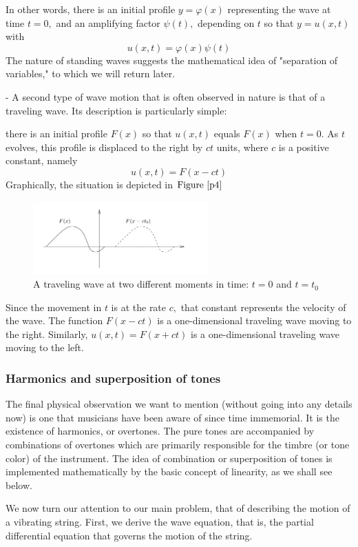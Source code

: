 \documentclass[12pt]{book}
\theoremstyle{definition}\newtheorem{dfn}{Définition}[chapter]
\theoremstyle{plain}\newtheorem{thm}{Théorème}[chapter]
\theoremstyle{plain}\newtheorem{prp}{Proposition}[chapter]
\theoremstyle{plain}\newtheorem{lem}{\bf Lemme}[chapter]
\theoremstyle{plain}\newtheorem{axm}{\bf Axiome}[chapter]
\theoremstyle{plain}\newtheorem{lmm}{\bf Lemme}[chapter]
\theoremstyle{plain}\newtheorem{exm}{\bf Example}[chapter]
\theoremstyle{plain}\newtheorem{cor}{\bf Corollaire}[chapter]
\theoremstyle{remark}\newtheorem{rem}{Remarque}[chapter]
\newcommand{\reffig}[1]{\text{Figure}\ \ref{#1}}
\begin{document}
In other words, there is an initial profile $y=\varphi(x)$ representing the wave at time $t=0,$ and an amplifying factor $\psi(t),$ depending on $t$ so that $y=u(x, t)$ with
$$
u(x, t)=\varphi(x) \psi(t)
$$
The nature of standing waves suggests the mathematical idea of "separation of variables," to which we will return later.

- A second type of wave motion that is often observed in nature is that of a traveling wave. Its description is particularly simple:

there is an initial profile $F(x)$ so that $u(x, t)$ equals $F(x)$ when $t=0 .$ As $t$ evolves, this profile is displaced to the right by $c t$ units, where $c$ is a positive constant, namely
$$
u(x, t)=F(x-c t)
$$
Graphically, the situation is depicted in $\reffig{p4}$
\begin{figure}[H]\centering\includegraphics[width=0.6\textwidth]{image//The Genesis of Fourier Analysis//4}
	\caption{A traveling wave at two different moments in time: $t=0$ and $t=t_{0}$}
	\label{p4}	
\end{figure}
Since the movement in $t$ is at the rate $c,$ that constant represents the velocity of the wave. The function $F(x-c t)$ is a one-dimensional traveling wave moving to the right. Similarly, $u(x, t)=F(x+c t)$ is a one-dimensional traveling wave moving to the left.
\subsubsection{Harmonics and superposition of tones}
The final physical observation we want to mention (without going into any details now) is one that musicians have been aware of since time immemorial. It is the existence of harmonics, or overtones. The pure tones are accompanied by combinations of overtones which are primarily responsible for the timbre (or tone color) of the instrument. The idea of combination or superposition of tones is implemented mathematically by the basic concept of linearity, as we shall see below.
\vspace{12pt}

We now turn our attention to our main problem, that of describing the motion of a vibrating string. First, we derive the wave equation, that is, the partial differential equation that governs the motion of the string.
\end{document}
